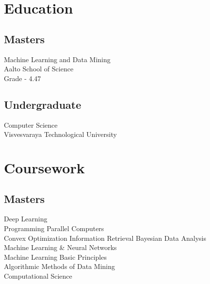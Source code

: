 \documentclass[]{deedy-resume}
\begin{document}
%
%
\lastupdated

%
%

%
%

\begin{minipage}[t]{0.33\textwidth} 


\section{Education} 
\subsection{Masters}
Machine Learning and Data Mining\\
Aalto School of Science\\
Grade - 4.47\\
\sectionsep

\subsection{Undergraduate}
Computer Science\\
Visvesvaraya Technological University\\



\section{Coursework}
\subsection{Masters}
\textbullet{} Deep Learning\\
\textbullet{} Programming Parallel Computers \\
\textbullet{} Convex Optimization 
\textbullet{} Information Retrieval
\textbullet{} Bayesian Data Analysis\\
\textbullet{} Machine Learning \& Neural Networks\\
\textbullet{} Machine Learning Basic Principles\\
\textbullet{} Algorithmic Methods of Data Mining\\
\textbullet{} Computational Science \\
\sectionsep


\end{minipage}
\end{document}
